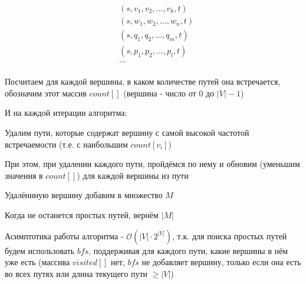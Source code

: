 \documentclass{report}
\begin{document}
\begin{align*}
    & (s, v_1, v_2, \dots, v_k, t) \\
    & (s, w_1, w_2, \dots, w_n, t) \\
    & (s, q_1, q_2, \dots, q_m, t) \\
    & (s, p_1, p_2, \dots, p_l, t) \\
    & \dots \\
\end{align*}

Посчитаем для каждой вершины, в каком количестве путей она встречается, обозначим этот массив $count[]$ (вершина - число от $0$ до $|V| - 1$)

И на каждой итерации алгоритма:

Удалим пути, которые содержат вершину с самой высокой частотой встречаемости (т.е. с наибольшим $count[v_i]$)

При этом, при удалении каждого пути, пройдёмся по нему и обновим (уменьшим значения в $count[]$) для каждой вершины из пути

Удалённную вершину добавим в множество $M$

Когда не останется простых путей, вернём $|M|$

Асимптотика работы алгоритма - $ \mathcal{O}(|V| \cdot 2^{|V|}) $, т.к. для поиска простых путей будем использовать $bfs$, поддерживая для каждого пути, какие вершины в нём уже есть
(массива $visited[]$ нет, $bfs$ не добавляет вершину, только если она есть во всех путях или длина текущего пути $\ge |V|$)

\par

\end{document}
